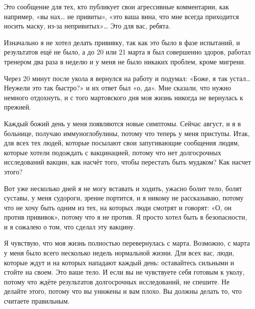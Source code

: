 Это сообщение для тех, кто публикует свои агрессивные комментарии, как например,
«вы нах… не привиты», «это ваша вина, что мне всегда приходится носить маску,
из-за непривитых»… Это для вас, ребята.

Изначально я не хотел делать прививку, так как это было в фазе испытаний, и
результатов ещё не было, а до 20 или 21 марта я был совершенно здоров, работал
тренером два раза в неделю и у меня не было никаких проблем, кроме мигрени.

Через 20 минут после укола я вернулся на работу и подумал: «Боже, я так устал…
Неужели это так быстро?» и их ответ был «о, да». Мне сказали, что нужно немного
отдохнуть, и с того мартовского дня моя жизнь никогда не вернулась к прежней.

Каждый божий день у меня появляются новые симптомы. Сейчас август, и я в
больнице, получаю иммуноглобулины, потому что теперь у меня приступы. Итак, для
всех тех людей, которые посылают свои запугивающие сообщения людям, которые
хотели подождать с вакцинацией, потому что нет долгосрочных исследований вакцин,
как насчёт того, чтобы перестать быть мудаком? Как насчет этого?

Вот уже несколько дней я не могу вставать и ходить, ужасно болит тело, болят
суставы, у меня судороги, зрение портится, и я никому не рассказываю, потому что
не хочу быть одним из тех, на которых люди смотрят и говорят: «О, он против
прививок», потому что я не против. Я просто хотел быть в безопасности, и я
сожалею о том, что сделал эту вакцину.

Я чувствую, что моя жизнь полностью перевернулась с марта. Возможно, с марта у
меня было всего несколько недель нормальной жизни. Для всех вас, люди, которые
ждут и на которых нападают каждый день: оставайтесь сильными и стойте на
своем. Это ваше тело. И если вы не чувствуете себя готовым к уколу, потому что
ждёте результатов долгосрочных исследований, не спешите. Не делайте этого,
потому что вы унижены и вам плохо. Вы должны делать то, что считаете правильным.
